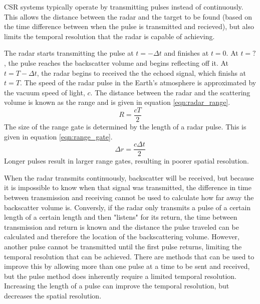 
CSR systems typically operate by transmitting pulses instead of continuously.  This allows the distance between the radar and the target to be found (based on the time difference between when the pulse is transmitted and recieved), but also limits the temporal resolution that the radar is capable of achieving.


The radar starts transmitting the pulse at \(t=-\Delta t\) and finishes at \(t=0\).  At \(t=?\), the pulse reaches the backscatter volume and begins reflecting off it.  At \(t=T-\Delta t\), the radar begins to received the the echoed signal, which finishs at \(t=T\).  The speed of the radar pulse in the Earth's atmosphere is approximated by the vacuum speed of light, \(c\).  The distance between the radar and the scattering volume is known as the range and is given in equation \ref{eqn:radar_range}.
\begin{equation}
	\label{eqn:radar_range}
	R = \frac{cT}{2}
\end{equation}
The size of the range gate is determined by the length of a radar pulse.  This is given in equation \ref{eqn:range_gate}.
\begin{equation}
	\label{eqn:range_gate}
	\Delta r = \frac{c\Delta t}{2}
\end{equation}
Longer pulses result in larger range gates, resulting in poorer spatial resolution.

When the radar transmits continuously, backscatter will be received, but because it is impossible to know when that signal was transmitted, the difference in time between transmission and receiving cannot be used to calculate how far away the backscatter volume is.  Conversly, if the radar only transmits a pulse of a certain length of a certain length and then "listens" for its return, the time between transmission and return is known and the distance the pulse traveled can be calculated and therefore the location of the backscattering volume.  However, another pulse cannot be transmitted until the first pulse returns, limiting the temporal resolution that can be achieved.  There are methods that can be used to improve this by allowing more than one pulse at a time to be sent and received, but the pulse method does inherently require a limited temporal resolution.  Increasing the length of a pulse can improve the temporal resolution, but decreases the spatial resolution.

